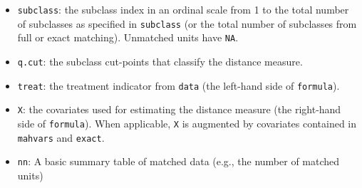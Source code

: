 \begin{itemize}
\item \texttt{subclass}: the subclass index in an ordinal scale from 1
  to the total number of subclasses as specified in \texttt{subclass}
  (or the total number of subclasses from full or exact matching).
  Unmatched units have \texttt{NA}.
  
\item \texttt{q.cut}: the subclass cut-points that classify the
  distance measure.
  
\item \texttt{treat}: the treatment indicator from \texttt{data} (the
  left-hand side of \texttt{formula}).
 
\item \texttt{X}: the covariates used for estimating the distance
  measure (the right-hand side of \texttt{formula}).  When applicable,
  \texttt{X} is augmented by covariates contained in \texttt{mahvars}
  and \texttt{exact}.

\item \texttt{nn}: A basic summary table of matched data (e.g., the
  number of matched units)

\end{itemize}


